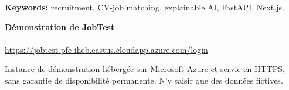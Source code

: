 \noindent\textbf{Keywords:} recruitment, CV-job matching, explainable AI, FastAPI, Next.js.

\vfill
\begin{center}
\textbf{Démonstration de JobTest}\\[3mm]
\\[2mm]
\url{https://jobtest-pfe-iheb.eastus.cloudapp.azure.com/login}\\[2mm]
\begin{minipage}{.8\textwidth}\centering\footnotesize
Instance de démonstration hébergée sur Microsoft Azure et servie en HTTPS, sans garantie de disponibilité permanente. N'y saisir que des données fictives.
\end{minipage}
\end{center}
